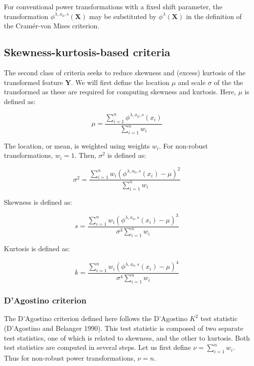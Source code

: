 \documentclass[preprint,12pt,authoryear]{elsarticle}
\begin{document}
For conventional power transformations with a fixed shift parameter, the
transformation \(\phi^{\lambda, x_0, s} (\mathbf{X})\) may be
substituted by \(\phi^{\lambda} (\mathbf{X})\) in the definition of the
Cramér-von Mises criterion.

\subsection{Skewness-kurtosis-based
criteria}\label{skewness-kurtosis-based-criteria}

The second class of criteria seeks to reduce skewness and (excess)
kurtosis of the transformed feature \(\mathbf{Y}\). We will first define
the location \(\mu\) and scale \(\sigma\) of the the transformed as
these are required for computing skewness and kurtosis. Here, \(\mu\) is
defined as:

\begin{equation}
\mu = \frac{\sum_{i=1}^n \phi^{\lambda, x_0, s} \left(x_i \right)} {\sum_{i=1}^n w_i}
\end{equation}

The location, or mean, is weighted using weights \(w_i\). For non-robust
transformations, \(w_i = 1\). Then, \(\sigma^2\) is defined as:

\begin{equation}
\sigma^2 = \frac{\sum_{i=1}^n w_i \left(\phi^{\lambda, x_0, s} \left( x_i \right) - \mu \right)^2}{\sum_{i=1}^n w_i}
\end{equation}

Skewness is defined as:

\begin{equation}
s = \frac{\sum_{i=1}^n w_i \left(\phi^{\lambda, x_0, s} \left( x_i \right) - \mu \right)^3}{\sigma^3 \sum_{i=1}^n w_i}
\end{equation}

Kurtosis is defined as:

\begin{equation}
k = \frac{\sum_{i=1}^n w_i \left(\phi^{\lambda, x_0, s} \left( x_i \right) - \mu \right)^4}{\sigma^4 \sum_{i=1}^n w_i}
\end{equation}

\subsubsection{D'Agostino criterion}\label{dagostino-criterion}

The D'Agostino criterion defined here follows the D'Agostino \(K^2\)
test statistic (D'Agostino and Belanger 1990). This test statistic is
composed of two separate test statistics, one of which is related to
skewness, and the other to kurtosis. Both test statistics are computed
in several steps. Let us first define \(\nu=\sum_{i=1}^n w_i\). Thus for
non-robust power transformations, \(\nu = n\).
\end{document}
